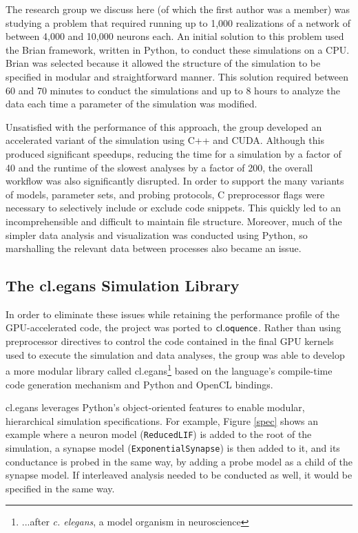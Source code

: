 \documentclass[10pt, conference, compsocconf]{IEEEtran}
\begin{document}
The research group we discuss here (of which the first author was a member) was studying a problem that required running up to 1,000 realizations of a network of between 4,000 and 10,000 neurons each. An initial solution to this problem used the Brian framework, written in Python, to conduct these simulations on a CPU. Brian was selected because it allowed the structure of the  simulation to be specified in modular and straightforward manner. This solution required between 60 and 70 minutes to conduct the simulations and up to 8 hours to analyze the data each time a parameter of the simulation was modified.

Unsatisfied with the performance of this approach, the group developed an accelerated variant of the simulation using C++ and CUDA. Although this produced significant speedups, reducing the time for a simulation by a factor of 40 and the runtime of the slowest analyses by a factor of 200, the overall workflow was also significantly disrupted. In order to support the many variants of models, parameter sets, and probing protocols, C preprocessor flags were necessary to selectively include or exclude code snippets. This quickly led to an incomprehensible and difficult to maintain file structure. Moreover, much of the simpler data analysis and visualization was conducted using Python, so marshalling the relevant data between processes also became an issue. 

\subsection{The {\sf cl.egans} Simulation Library}
In order to eliminate these issues while retaining the performance profile of the GPU-accelerated code, the project was ported to $\textsf{cl.oquence}$. Rather than using preprocessor directives to control the code contained in the final GPU kernels used to execute the simulation and data analyses, the group was able to develop a more modular  library called {\sf cl.egans}\footnote{...after {\it c. elegans}, a model organism in neuroscience} based on the language's compile-time code generation mechanism and Python and OpenCL bindings.

{\sf cl.egans} leverages Python's object-oriented features to enable modular, hierarchical simulation specifications. For example, Figure \ref{spec} shows an example where a neuron model (\verb|ReducedLIF|) is added to the root of the simulation, a synapse model (\verb|ExponentialSynapse|) is then added to it, and its conductance is probed in the same way, by adding a probe model as a child of the synapse model. If interleaved analysis needed to be conducted as well, it would be specified in the same way.
\end{document}
